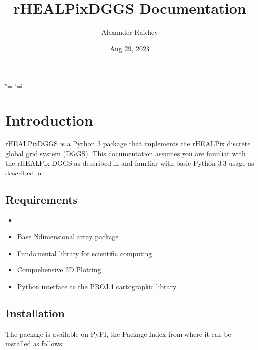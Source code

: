 \documentclass[a4paper,12ptopenany,oneside,english]{sphinxmanual}
\title{rHEALPixDGGS Documentation}
\date{Aug 29, 2023}
\author{Alexander Raichev}
\begin{document}
\ifdefined\shorthandoff
  \ifnum\catcode`\=\string=\active\shorthandoff{=}\fi
  \ifnum\catcode`\"=\active{}\fi
\fi

\pagestyle{empty}
\sphinxmaketitle
\pagestyle{plain}
\sphinxtableofcontents
\pagestyle{normal}
\label{\detokenize{index::doc}}


\sphinxstepscope


\chapter{Introduction}
\label{\detokenize{introduction:introduction}}\label{\detokenize{introduction::doc}}
\sphinxAtStartPar
rHEALPixDGGS is a Python 3 package that implements the rHEALPix discrete global grid system (DGGS).
This documentation assumes you are familiar with the rHEALPix DGGS as described in  and familiar with basic Python 3.3 usage as described in .


\section{Requirements}
\label{\detokenize{introduction:requirements}}\begin{itemize}
\item {} 
\sphinxAtStartPar
{}

\item {} 
\sphinxAtStartPar
{} Base N\sphinxhyphen{}dimensional array package

\item {} 
\sphinxAtStartPar
{} Fundamental library for scientific computing

\item {} 
\sphinxAtStartPar
{} Comprehensive 2D Plotting

\item {} 
\sphinxAtStartPar
{}
Python interface to the PROJ.4 cartographic library

\end{itemize}


\section{Installation}
\label{\detokenize{introduction:installation}}
\sphinxAtStartPar
The package is available on PyPI, the Package Index from where it can be installed as follows:
\end{document}
